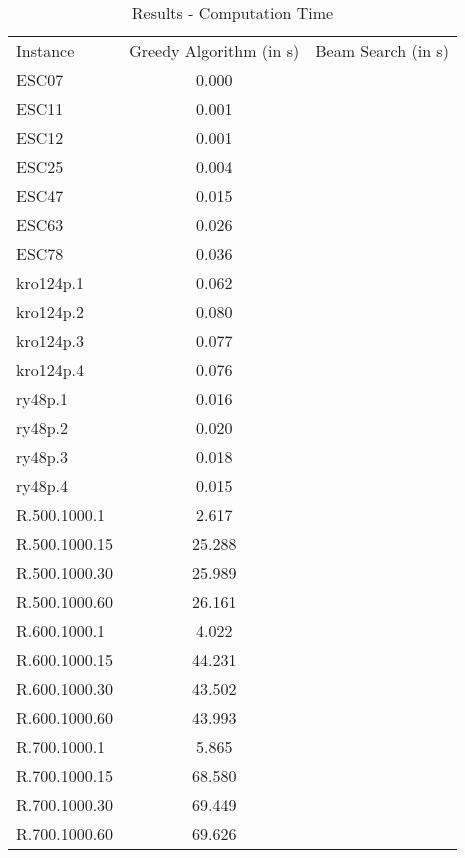 \documentclass[crop=false]{standalone}
\begin{document}
\begin{table}[htb]
	\begin{tabular}{lcc}
		Instance & Greedy Algorithm (in s) & Beam Search (in s) \\
		ESC07 & 0.000 & \\
		ESC11 & 0.001 & \\
		ESC12 & 0.001 & \\
		ESC25 & 0.004 & \\
		ESC47 & 0.015 & \\
		ESC63 & 0.026 & \\
		ESC78 & 0.036 & \\
		kro124p.1 & 0.062 & \\
		kro124p.2 & 0.080 & \\
		kro124p.3 & 0.077 & \\
		kro124p.4 & 0.076 & \\
		ry48p.1   & 0.016 & \\
		ry48p.2   & 0.020 & \\
		ry48p.3   & 0.018 & \\
		ry48p.4   & 0.015 & \\
		R.500.1000.1  & 2.617 & \\
		R.500.1000.15 & 25.288 & \\
		R.500.1000.30 & 25.989 & \\
		R.500.1000.60 & 26.161 & \\
		R.600.1000.1  & 4.022 & \\
		R.600.1000.15 & 44.231 & \\
		R.600.1000.30 & 43.502 & \\
		R.600.1000.60 & 43.993 & \\
		R.700.1000.1  & 5.865 & \\
		R.700.1000.15 & 68.580 & \\
		R.700.1000.30 & 69.449 & \\
		R.700.1000.60 & 69.626 & \\
	\end{tabular}
	\caption{Results - Computation Time}
	\label{table:results_time}
\end{table}
\end{document}
